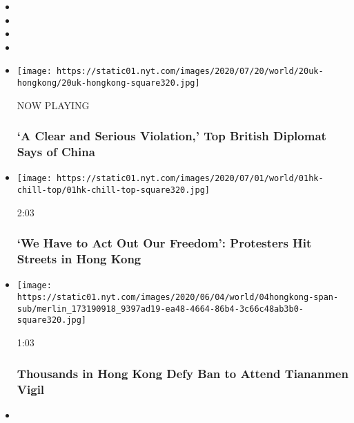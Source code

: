 \begin{itemize}
\item
\item
\item
\item
\end{itemize}

\begin{itemize}
\item
  \texttt{[image: https://static01.nyt.com/images/2020/07/20/world/20uk-hongkong/20uk-hongkong-square320.jpg]}

  NOW PLAYING

  \hypertarget{a-clear-and-serious-violation-top-british-diplomat-says-of-china-2}{%
  \subsubsection{`A Clear and Serious Violation,' Top British Diplomat
  Says of
  China}\label{a-clear-and-serious-violation-top-british-diplomat-says-of-china-2}}
\item
  \href{https://www.nytimes.com/video/world/100000007218668/hong-kong-protests-china.html?action=click\&module=video-series-bar\&region=header\&pgtype=Article\&playlistId=video/hk-protest}{}

  \texttt{[image: https://static01.nyt.com/images/2020/07/01/world/01hk-chill-top/01hk-chill-top-square320.jpg]}

  2:03

  \hypertarget{we-have-to-act-out-our-freedom-protesters-hit-streets-in-hong-kong}{%
  \subsubsection{`We Have to Act Out Our Freedom': Protesters Hit
  Streets in Hong
  Kong}\label{we-have-to-act-out-our-freedom-protesters-hit-streets-in-hong-kong}}
\item
  \href{https://www.nytimes.com/video/world/asia/100000007174092/hong-kong-china-tiananmen-vigil.html?action=click\&module=video-series-bar\&region=header\&pgtype=Article\&playlistId=video/hk-protest}{}

  \texttt{[image: https://static01.nyt.com/images/2020/06/04/world/04hongkong-span-sub/merlin\_173190918\_9397ad19-ea48-4664-86b4-3c66c48ab3b0-square320.jpg]}

  1:03

  \hypertarget{thousands-in-hong-kong-defy-ban-to-attend-tiananmen-vigil}{%
  \subsubsection{Thousands in Hong Kong Defy Ban to Attend Tiananmen
  Vigil}\label{thousands-in-hong-kong-defy-ban-to-attend-tiananmen-vigil}}
\item
  \href{https://www.nytimes.com/video/world/asia/100000007154970/hong-kong-protests-security-legislation.html?action=click\&module=video-series-bar\&region=header\&pgtype=Article\&playlistId=video/hk-protest}{}


\end{itemize}
